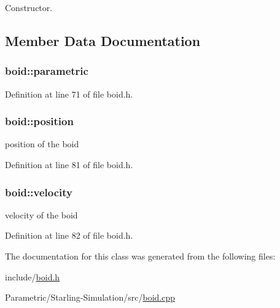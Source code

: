 Constructor. 



\subsection{Member Data Documentation}
\subsubsection[{\texorpdfstring{parametric}{parametric}}]{ boid\+::parametric}\hypertarget{classboid_a38d3b4b3c937c9611505ebc533331276}{}\label{classboid_a38d3b4b3c937c9611505ebc533331276}


Definition at line 71 of file boid.\+h.

\subsubsection[{\texorpdfstring{position}{position}}]{ boid\+::position}\hypertarget{classboid_aa6af55bf8ffe2a9a19332d12ec632a06}{}\label{classboid_aa6af55bf8ffe2a9a19332d12ec632a06}


position of the boid 



Definition at line 81 of file boid.\+h.

\subsubsection[{\texorpdfstring{velocity}{velocity}}]{ boid\+::velocity}\hypertarget{classboid_a811f5915fa6b7eea89f02b5a455baca4}{}\label{classboid_a811f5915fa6b7eea89f02b5a455baca4}


velocity of the boid 



Definition at line 82 of file boid.\+h.



The documentation for this class was generated from the following files\+:\begin{DoxyCompactItemize}
\item 
include/\hyperlink{include_2boid_8h}{boid.\+h}\item 
Parametric/\+Starling-\/\+Simulation/src/\hyperlink{_parametric_2_starling-_simulation_2src_2boid_8cpp}{boid.\+cpp}\end{DoxyCompactItemize}
